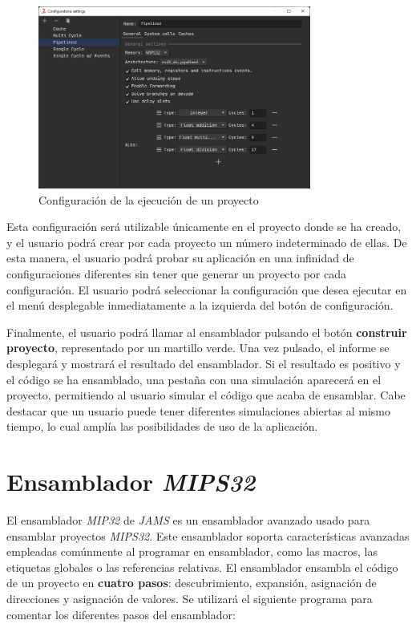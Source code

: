 \begin{figure}[h]
    \centering
    \includegraphics[width=0.8\textwidth]{images/mips/mips-configuration}
    \caption{Configuración de la ejecución de un proyecto}
    \label{fig:jams-configuration}
\end{figure}

Esta configuración será utilizable únicamente en el proyecto
donde se ha creado, y el usuario podrá crear por cada proyecto
un número indeterminado de ellas.
De esta manera, el usuario podrá probar su aplicación en una infinidad
de configuraciones diferentes sin tener que generar un proyecto por cada
configuración.
El usuario podrá seleccionar la configuración que desea ejecutar en
el menú desplegable inmediatamente a la izquierda del botón de configuración.

Finalmente, el usuario podrá llamar al ensamblador pulsando el botón
\textbf{construir proyecto}, representado por un martillo verde.
Una vez pulsado, el informe se desplegará y mostrará el resultado del ensamblador.
Si el resultado es positivo y el código se ha ensamblado, una pestaña con
una simulación aparecerá en el proyecto, permitiendo al usuario simular
el código que acaba de ensamblar.
Cabe destacar que un usuario puede tener diferentes simulaciones abiertas
al mismo tiempo, lo cual amplía las posibilidades de uso de la
aplicación.


\section{Ensamblador \textit{MIPS32}}\label{sec:ensamblador-mips32}

El ensamblador \textit{MIP32} de \textit{JAMS} es un ensamblador avanzado
usado para ensamblar proyectos \textit{MIPS32}.
Este ensamblador soporta características avanzadas empleadas
comúnmente al programar en ensamblador, como las macros,
las etiquetas globales o las referencias relativas.
El ensamblador ensambla el código de un proyecto en \textbf{cuatro pasos}:
descubrimiento, expansión, asignación de direcciones y asignación de valores.
Se utilizará el siguiente programa para comentar los diferentes pasos del ensamblador:

